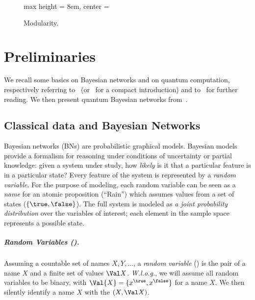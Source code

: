 \begin{figure}
\begin{minipage}[b]{0.6\linewidth}
\begin{adjustbox}{max height = 8em, center = \linewidth}
\end{adjustbox}
\caption{Modularity.}
\label{fig:modular}
\end{minipage}
\end{figure}


\section{Preliminaries}
\label{sec:background}

We recall some basics on Bayesian networks and on quantum computation, respectively referring to~\cite{DarwicheBook} (or~\cite{DarwicheHandbook} for a compact introduction) and to~\cite{Nielsen_book,Watrous_book} for further reading.
We then present quantum Bayesian networks from~\cite{GBN2014}.

\subsection{Classical data and Bayesian Networks}
\label{sec:BN}

Bayesian networks (BNs) are probabilistic graphical models.
Bayesian models provide a formalism for reasoning under conditions of uncertainty or partial knowledge: given a system under study, how \emph{likely} is it that a particular feature is in a particular state?
Every feature of the system is represented by a \emph{random variable}.
For the purpose of modeling, each random variable can be seen as a \emph{name} for an atomic proposition (\eg ``Rain'') which assumes values from a set of states (\eg $\{\true,\false\}$).
The full system is modeled as \emph{a joint probability distribution} over the variables of interest; each element in the sample space represents a possible state.

\subparagraph{Random Variables (\rvs).}

Assuming a countable set of names $X,Y,\dots$, a \emph{random variable} (\rv) is the pair of a name $X$ and a finite set of values $\Val X$.
\emph{W.l.o.g.}, we will assume all random variables to be binary, with $\Val{X}=\{x^\true,x^\false\}$ for a name $X$.
We then silently identify a name $X$ with the \rv $(X, \Val X)$.

